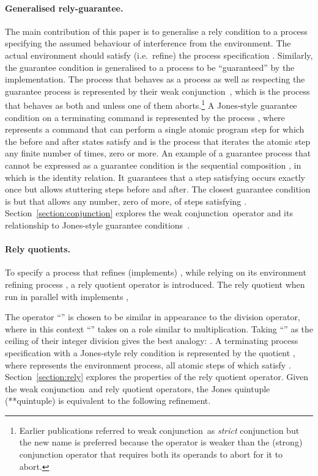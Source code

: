 \documentclass[fleqn]{fac}
\makeatletter
\def\refproperty{\@ifnextchar*{\@refproperty}{\@@refproperty}}
\def\@refproperty*#1{\ref{property-#1}\index{Property!#1|LawUse}}
\def\@@refproperty#1{property~(\ref{property-#1})\index{Property!#1|LawUse}}
\newcommand{\strictconjunction}{weak conjunction}
\makeatother
\begin{document}
\paragraph{Generalised rely-guarantee.}

The main contribution of this paper is to generalise a rely condition  to 
a process  specifying the assumed behaviour of interference from the environment.
The actual environment should satisfy (i.e.\ refine) the process specification .
Similarly, the guarantee condition  is generalised to a process 
to be ``guaranteed'' by the implementation.
The process that behaves as a process  as well as respecting the guarantee process 
is represented by their \strictconjunction\ ,
which is the process that behaves as both  and  unless one of them aborts.\footnote{Earlier publications referred to \strictconjunction\ as \emph{strict} conjunction
but the new name is preferred because the operator is weaker than the (strong) conjunction operator 
that requires both its operands to abort for it to abort.}
A Jones-style guarantee condition  on a terminating command  is represented by 
the process ,
where 
 represents a command that can perform a single atomic program step 
for which the before and after states satisfy 
and
 is the process 
that iterates the atomic step  any finite number
of times, zero or more.
An example of a guarantee process that cannot be expressed as a guarantee condition is
the sequential composition 
,
in which  is the identity relation.
It guarantees that a step satisfying  occurs exactly once but allows stuttering 
steps before and after.
The closest guarantee condition is  but that allows any number, zero of more, of steps satisfying .
Section~\ref{section:conjunction} explores the \strictconjunction\ operator and 
its relationship to Jones-style guarantee conditions~\cite{FACJexSEFM-14}.


\paragraph{Rely quotients.}

To specify a process that refines (implements) ,
while relying on its environment refining process ,
a rely quotient operator  is introduced.
The rely quotient  when run in parallel with  implements ,

The operator ``'' is chosen to be similar in appearance to the division operator, 
where in this context ``'' takes on a role similar to multiplication.
\label{division}Taking ``'' as the ceiling of their integer division  gives the best analogy:
.
A terminating process specification  with a Jones-style rely condition  
is represented by the quotient ,
where  represents the environment process,
all atomic steps of which satisfy .
Section~\ref{section:rely} explores the properties of the rely quotient operator.
Given the \strictconjunction\ and rely quotient operators, the Jones quintuple (\refproperty*{quintuple})
is equivalent to the following refinement.
\end{document}
